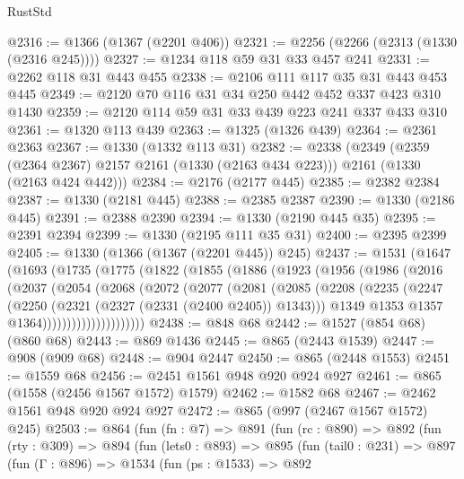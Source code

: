 \begin{lexlean}{RustStd}
\begin{coremodule}
@2316 := @1366 (@1367 (@2201 @406))
@2321 := @2256 (@2266 (@2313 (@1330 (@2316 @245))))
@2327 := @1234 @118 @59 @31 @33 @457 @241
@2331 := @2262 @118 @31 @443 @455
@2338 := @2106 @111 @117 @35 @31 @443 @453 @445
@2349 := @2120 @70 @116 @31 @34 @250 @442 @452 @337 @423 @310 @1430
@2359 := @2120 @114 @59 @31 @33 @439 @223 @241 @337 @433 @310
@2361 := @1320 @113 @439
@2363 := @1325 (@1326 @439)
@2364 := @2361 @2363
@2367 := @1330 (@1332 @113 @31)
@2382 := @2338
    (@2349
      (@2359 (@2364 @2367) @2157 @2161 (@1330 (@2163 @434 @223)))
      @2161
      (@1330 (@2163 @424 @442)))
@2384 := @2176 (@2177 @445)
@2385 := @2382 @2384
@2387 := @1330 (@2181 @445)
@2388 := @2385 @2387
@2390 := @1330 (@2186 @445)
@2391 := @2388 @2390
@2394 := @1330 (@2190 @445 @35)
@2395 := @2391 @2394
@2399 := @1330 (@2195 @111 @35 @31)
@2400 := @2395 @2399
@2405 := @1330 (@1366 (@1367 (@2201 @445)) @245)
@2437 := @1531
    (@1647
      (@1693
        (@1735
          (@1775
            (@1822
              (@1855
                (@1886
                  (@1923
                    (@1956
                      (@1986
                        (@2016
                          (@2037
                            (@2054
                              (@2068
                                (@2072
                                  (@2077
                                    (@2081
                                      (@2085
                                        (@2208
                                          (@2235
                                            (@2247
                                              (@2250 (@2321 (@2327 (@2331 (@2400 @2405)) @1343)))
                                              @1349
                                              @1353
                                              @1357
                                              @1364)))))))))))))))))))))
@2438 := @848 @68
@2442 := @1527 (@854 @68) (@860 @68)
@2443 := @869 @1436
@2445 := @865 (@2443 @1539)
@2447 := @908 (@909 @68)
@2448 := @904 @2447
@2450 := @865 (@2448 @1553)
@2451 := @1559 @68
@2456 := @2451 @1561 @948 @920 @924 @927
@2461 := @865 (@1558 (@2456 @1567 @1572) @1579)
@2462 := @1582 @68
@2467 := @2462 @1561 @948 @920 @924 @927
@2472 := @865 (@997 (@2467 @1567 @1572) @245)
@2503 := @864
    (fun (fn : @7) =>
    @891
      (fun (rc : @890) =>
      @892
        (fun (rty : @309) =>
        @894
          (fun (lets0 : @893) =>
          @895
            (fun (tail0 : @231) =>
            @897
              (fun (Γ : @896) =>
              @1534
                (fun (ps : @1533) =>
                @892

\end{coremodule}
\end{lexlean}
